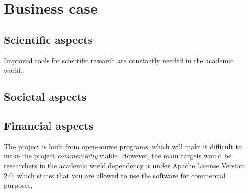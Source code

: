 \section{Business case}

\subsection{Scientific aspects}

Improved tools for scientific research are constantly needed in the academic world.

\subsection{Societal aspects}



\subsection{Financial aspects}

The project is built from open-source programs, which will make it difficult to make the project \textit{commercially} viable. However, the main targets would be researchers in the academic world,dependency is under Apache License Version 2.0, which states that you are allowed to use the software for commercial purposes,
